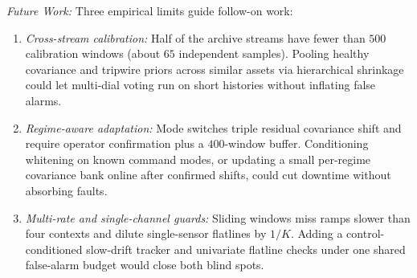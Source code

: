 \documentclass[journal]{IEEEtran}
\begin{document}
\noindent\emph{Future Work:} Three empirical limits guide follow-on work:
\begin{enumerate}[leftmargin=*, nosep, itemsep=1pt]
    \item \emph{Cross-stream calibration:} Half of the archive streams have fewer than $500$ calibration windows (about $65$ independent samples). Pooling healthy covariance and tripwire priors across similar assets via hierarchical shrinkage could let multi-dial voting run on short histories without inflating false alarms.
    \item \emph{Regime-aware adaptation:} Mode switches triple residual covariance shift and require operator confirmation plus a $400$-window buffer. Conditioning whitening on known command modes, or updating a small per-regime covariance bank online after confirmed shifts, could cut downtime without absorbing faults.
    \item \emph{Multi-rate and single-channel guards:} Sliding windows miss ramps slower than four contexts and dilute single-sensor flatlines by $1/K$. Adding a control-conditioned slow-drift tracker and univariate flatline checks under one shared false-alarm budget would close both blind spots.
\end{enumerate}

\def\IEEEbibitemsep{0pt}
\def\BIBdecl{\fontsize{7.0pt}{8.0pt}\selectfont\setlength{\itemsep}{-2.0pt plus 0.2pt minus 0.1pt}\setlength{\parsep}{0pt}}


\end{document}

